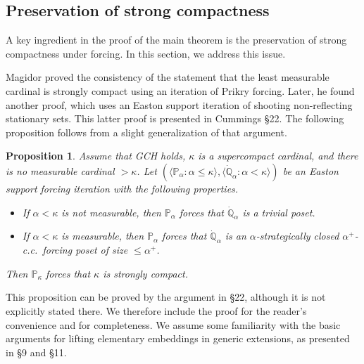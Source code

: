 \documentclass[a4paper,12pt,reqno,oneside]{amsart}
\theoremstyle{plain}
\newtheorem{prop}[theorem]{Proposition}
\newcommand{\mbb}{\mathbb}
\begin{document}
\subsection{Preservation of strong compactness} \label{sec:pres_stcmpct}

A key ingredient in the proof of the main theorem is the preservation of strong compactness under forcing. In this section, we address this issue.

Magidor \cite{Ma} proved the consistency of the statement that the least measurable cardinal is strongly compact using an iteration of Prikry forcing. Later, he found another proof, which uses an Easton support iteration of shooting non-reflecting stationary sets. This latter proof is presented in Cummings \cite{C} \S 22. The following proposition follows from a slight generalization of that argument.


\begin{prop} \label{prop:pres_strcmpct}
Assume that GCH holds, $\kappa$ is a supercompact cardinal, and there is no measurable cardinal $> \kappa$. Let $( \langle \mbb{P}_\alpha : \alpha \leq \kappa \rangle , \langle \dot{\mbb{Q}}_\alpha : \alpha < \kappa \rangle )$ be an Easton support forcing iteration with the following properties.
\begin{itemize}
\item[(I)] If $\alpha < \kappa$ is not measurable, then $\mbb{P}_\alpha$ forces that $\dot{\mbb{Q}}_\alpha$ is a trivial poset.
\item[(II)] If $\alpha < \kappa$ is measurable, then $\mbb{P}_\alpha$ forces that $\dot{\mbb{Q}}_\alpha$ is an $\alpha$-strategically closed $\alpha^+$-c.c.~forcing poset of size $\leq \alpha^+$.
\end{itemize}
Then $\mbb{P}_\kappa$ forces that $\kappa$ is strongly compact.
\end{prop}


This proposition can be proved by the argument in \cite{C} \S 22, although it is not explicitly stated there. We therefore include the proof for the reader's convenience and for completeness. We assume some familiarity with the basic arguments for lifting elementary embeddings in generic extensions, as presented in \cite{C} \S 9 and \S11.
\end{document}
